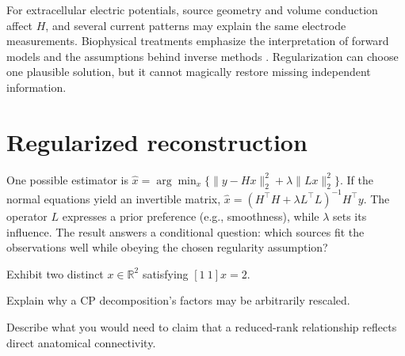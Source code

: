 For extracellular electric potentials, source geometry and volume conduction affect $H$, and several current patterns may explain the same electrode measurements. Biophysical treatments emphasize the interpretation of forward models and the assumptions behind inverse methods \cite{Buzsaki2012,Einevoll2013}. Regularization can choose one plausible solution, but it cannot magically restore missing independent information.

\section{Regularized reconstruction}
One possible estimator is $\hat x=\arg\min_x\{\|y-Hx\|_2^2+\lambda\|Lx\|_2^2\}$. If the normal equations yield an invertible matrix, $\hat x=(H^\top H+\lambda L^\top L)^{-1}H^\top y$. The operator $L$ expresses a prior preference (e.g., smoothness), while $\lambda$ sets its influence. The result answers a conditional question: which sources fit the observations well while obeying the chosen regularity assumption?

\begin{exercises}
\item Exhibit two distinct $x\in\mathbb R^2$ satisfying $[1\ 1]x=2$.
\item Explain why a CP decomposition's factors may be arbitrarily rescaled.
\item Describe what you would need to claim that a reduced-rank relationship reflects direct anatomical connectivity.
\end{exercises}